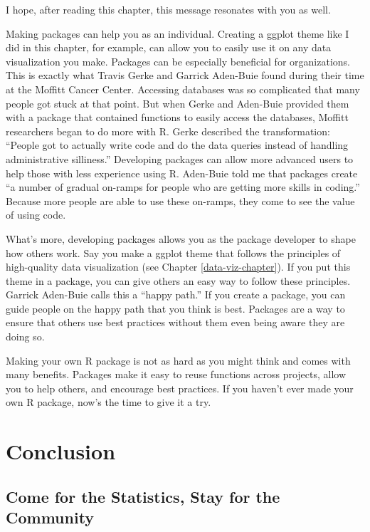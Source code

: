 \documentclass[
]{book}
\begin{document}
I hope, after reading this chapter, this message resonates with you as well.

Making packages can help you as an individual. Creating a ggplot theme like I did in this chapter, for example, can allow you to easily use it on any data visualization you make. Packages can be especially beneficial for organizations. This is exactly what Travis Gerke and Garrick Aden-Buie found during their time at the Moffitt Cancer Center. Accessing databases was so complicated that many people got stuck at that point. But when Gerke and Aden-Buie provided them with a package that contained functions to easily access the databases, Moffitt researchers began to do more with R. Gerke described the transformation: ``People got to actually write code and do the data queries instead of handling administrative silliness.'' Developing packages can allow more advanced users to help those with less experience using R. Aden-Buie told me that packages create ``a number of gradual on-ramps for people who are getting more skills in coding.'' Because more people are able to use these on-ramps, they come to see the value of using code.

What's more, developing packages allows you as the package developer to shape how others work. Say you make a ggplot theme that follows the principles of high-quality data visualization (see Chapter \ref{data-viz-chapter}). If you put this theme in a package, you can give others an easy way to follow these principles. Garrick Aden-Buie calls this a ``happy path.'' If you create a package, you can guide people on the happy path that you think is best. Packages are a way to ensure that others use best practices without them even being aware they are doing so.

Making your own R package is not as hard as you might think and comes with many benefits. Packages make it easy to reuse functions across projects, allow you to help others, and encourage best practices. If you haven't ever made your own R package, now's the time to give it a try.

\hypertarget{part-conclusion}{%
\part*{Conclusion}\label{part-conclusion}}

\hypertarget{conclusion}{%
\chapter{Come for the Statistics, Stay for the Community}\label{conclusion}}
\end{document}
